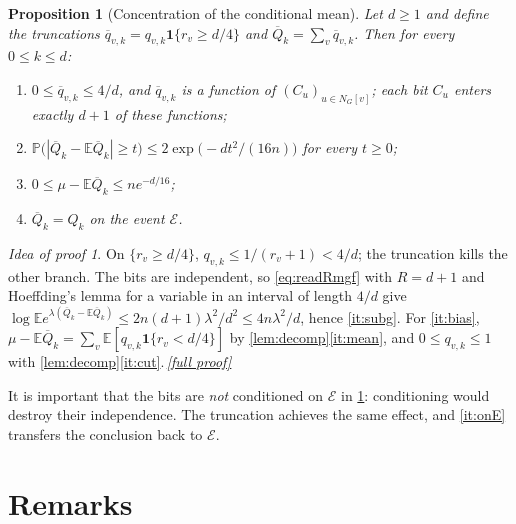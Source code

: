 \documentclass[11pt,a4paper]{article}
\theoremstyle{plain}
\newtheorem{proposition}[theorem]{Proposition}
\theoremstyle{definition}
\theoremstyle{remark}
\newtheorem*{proofidea}{Idea of proof}
\newcommand{\fullproofref}[1]{\,\hyperref[#1]{\textit{[full proof]}}}
\newcommand{\EE}{\mathbb E}
\newcommand{\PP}{\mathbb P}
\newcommand{\ind}{\mathbf 1}
\newcommand{\cE}{\mathcal E}
\newcommand{\Qbar}{\overline Q}
\newcommand{\qbar}{\overline q}
\begin{document}
\begin{proposition}[Concentration of the conditional mean]\label{prop:condmean}
Let $d\ge1$ and define the truncations $\qbar_{v,k}=q_{v,k}\ind\{r_v\ge d/4\}$ and $\Qbar_k=\sum_v\qbar_{v,k}$. Then for every $0\le k\le d$:
\begin{enumerate}[label=\textup{(\alph*)},itemsep=1pt]
\item\label{it:bounded} $0\le\qbar_{v,k}\le4/d$, and $\qbar_{v,k}$ is a function of $(C_u)_{u\in N_G[v]}$; each bit $C_u$ enters exactly $d+1$ of these functions;
\item\label{it:subg} $\PP\bigl(|\Qbar_k-\EE\Qbar_k|\ge t\bigr)\le2\exp\bigl(-dt^2/(16n)\bigr)$ for every $t\ge0$;
\item\label{it:bias} $0\le\mu-\EE\Qbar_k\le ne^{-d/16}$;
\item\label{it:onE} $\Qbar_k=Q_k$ on the event $\cE$.
\end{enumerate}
\end{proposition}

\begin{proofidea}
On $\{r_v\ge d/4\}$, $q_{v,k}\le1/(r_v+1)<4/d$; the truncation kills the other branch. The bits are independent, so \eqref{eq:readRmgf} with $R=d+1$ and Hoeffding's lemma \cite{Hoeffding63} for a variable in an interval of length $4/d$ give $\log\EE e^{\lambda(\Qbar_k-\EE\Qbar_k)}\le2n(d+1)\lambda^2/d^2\le4n\lambda^2/d$, hence \ref{it:subg}. For \ref{it:bias}, $\mu-\EE\Qbar_k=\sum_v\EE[q_{v,k}\ind\{r_v<d/4\}]$ by \cref{lem:decomp}\ref{it:mean}, and $0\le q_{v,k}\le1$ with \cref{lem:decomp}\ref{it:cut}.\fullproofref{pf:condmean}
\end{proofidea}

It is important that the bits are \emph{not} conditioned on $\cE$ in \cref{prop:condmean}: conditioning would destroy their independence. The truncation achieves the same effect, and \ref{it:onE} transfers the conclusion back to $\cE$.

\section{Remarks}\label{sec:remarks}
\end{document}
